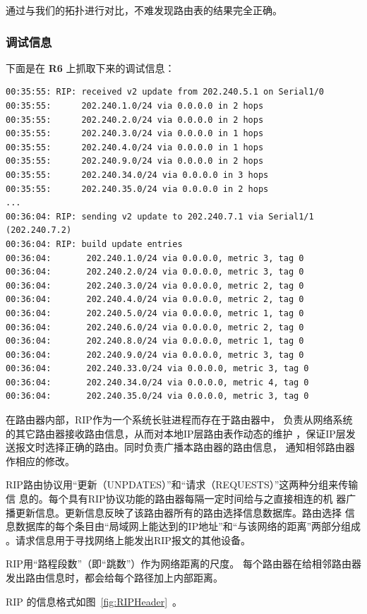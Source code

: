 \documentclass[black,normal,cn]{elegantnote}
\begin{document}
通过与我们的拓扑进行对比，不难发现路由表的结果完全正确。

\subsubsection{调试信息}
下面是在 \textbf{R6} 上抓取下来的调试信息：

\begin{lstlisting}
00:35:55: RIP: received v2 update from 202.240.5.1 on Serial1/0
00:35:55:      202.240.1.0/24 via 0.0.0.0 in 2 hops
00:35:55:      202.240.2.0/24 via 0.0.0.0 in 2 hops
00:35:55:      202.240.3.0/24 via 0.0.0.0 in 1 hops
00:35:55:      202.240.4.0/24 via 0.0.0.0 in 1 hops
00:35:55:      202.240.9.0/24 via 0.0.0.0 in 2 hops
00:35:55:      202.240.34.0/24 via 0.0.0.0 in 3 hops
00:35:55:      202.240.35.0/24 via 0.0.0.0 in 2 hops
...
00:36:04: RIP: sending v2 update to 202.240.7.1 via Serial1/1 (202.240.7.2)
00:36:04: RIP: build update entries
00:36:04:       202.240.1.0/24 via 0.0.0.0, metric 3, tag 0
00:36:04:       202.240.2.0/24 via 0.0.0.0, metric 3, tag 0
00:36:04:       202.240.3.0/24 via 0.0.0.0, metric 2, tag 0
00:36:04:       202.240.4.0/24 via 0.0.0.0, metric 2, tag 0
00:36:04:       202.240.5.0/24 via 0.0.0.0, metric 1, tag 0
00:36:04:       202.240.6.0/24 via 0.0.0.0, metric 2, tag 0
00:36:04:       202.240.8.0/24 via 0.0.0.0, metric 1, tag 0
00:36:04:       202.240.9.0/24 via 0.0.0.0, metric 3, tag 0
00:36:04:       202.240.33.0/24 via 0.0.0.0, metric 3, tag 0
00:36:04:       202.240.34.0/24 via 0.0.0.0, metric 4, tag 0
00:36:04:       202.240.35.0/24 via 0.0.0.0, metric 3, tag 0
\end{lstlisting}

在路由器内部，RIP作为一个系统长驻进程而存在于路由器中，
负责从网络系统的其它路由器接收路由信息，从而对本地IP层路由表作动态的维护
，保证IP层发送报文时选择正确的路由。同时负责广播本路由器的路由信息，
通知相邻路由器作相应的修改。

RIP路由协议用“更新（UNPDATES）”和“请求（REQUESTS）”这两种分组来传输信
息的。每个具有RIP协议功能的路由器每隔一定时间给与之直接相连的机
器广播更新信息。更新信息反映了该路由器所有的路由选择信息数据库。路由选择
信息数据库的每个条目由“局域网上能达到的IP地址”和“与该网络的距离”两部分组成
。请求信息用于寻找网络上能发出RIP报文的其他设备。

RIP用“路程段数”（即“跳数”）作为网络距离的尺度。
每个路由器在给相邻路由器发出路由信息时，都会给每个路径加上内部距离。

RIP 的信息格式如图~\ref{fig:RIPHeader}~。
\end{document}
